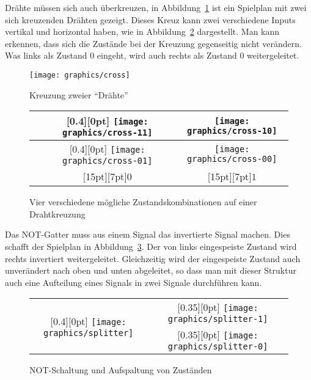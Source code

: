 Drähte müssen sich auch überkreuzen, in Abbildung~\ref{minesweeper-cross}
ist ein Spielplan mit zwei sich kreuzenden Drähten gezeigt.
Dieses
Kreuz kann zwei verschiedene Inputs vertikal und horizontal haben,
wie in Abbildung~\ref{minesweeper-crosses} dargestellt.
Man kann
erkennen, dass sich die Zustände bei der Kreuzung gegenseitig nicht
verändern.
Was links als Zustand 0 eingeht, wird auch rechts als Zustand
0 weitergeleitet.
\begin{figure}
\begin{center}
\texttt{[image: graphics/cross]}
\end{center}
\caption{Kreuzung zweier ``Drähte''\label{minesweeper-cross}}
\end{figure}%
\begin{figure}
\begin{center}
\begin{tabular}{|l|c|c|}
\hline
\raisebox{12ex}{$0$}&
\raisebox{0pt}[0.4\hsize][0pt]{%
\texttt{[image: graphics/cross-11]}}&
\texttt{[image: graphics/cross-10]}\\
\hline
\raisebox{12ex}{$1$}&
\raisebox{0pt}[0.4\hsize][0pt]{%
\texttt{[image: graphics/cross-01]}}&
\texttt{[image: graphics/cross-00]}\\
\hline
&\raisebox{0pt}[15pt][7pt]{$0$}&%
\raisebox{0pt}[15pt][7pt]{$1$}\\
\hline
\end{tabular}
\end{center}
\caption{Vier verschiedene mögliche Zustandskombinationen auf
einer Drahtkreuzung\label{minesweeper-crosses}}
\end{figure}%

Das NOT-Gatter muss aus einem Signal das invertierte Signal
machen.
Dies schafft der Spielplan in Abbildung~\ref{splitter}.
Der von links eingespeiste Zustand wird rechts invertiert weitergeleitet.
Gleichzeitig wird der eingespeiste Zustand auch unverändert nach
oben und unten abgeleitet, so dass man mit dieser Struktur auch
eine Aufteilung eines Signals in zwei Signale durchführen kann.
\begin{figure}
\begin{center}
\begin{tabular}{|c|c|c|c|}
\hline
\multirow{2}{0.4\hsize}{%
\raisebox{-5ex}[0.4\hsize][0pt]{%
\texttt{[image: graphics/splitter]}%
}}&
\raisebox{11.5ex}{$0$}&
\raisebox{0pt}[0.35\hsize][0pt]{%
\texttt{[image: graphics/splitter-1]}}&
\raisebox{11ex}{$1$}\\
\cline{2-4}
&
\raisebox{11.5ex}{$1$}&
\raisebox{0pt}[0.35\hsize][0pt]{%
\texttt{[image: graphics/splitter-0]}}&
\raisebox{11ex}{$0$}\\
\hline
\end{tabular}
\end{center}
\caption{NOT-Schaltung und Aufspaltung von Zuständen\label{splitter}}
\end{figure}%


